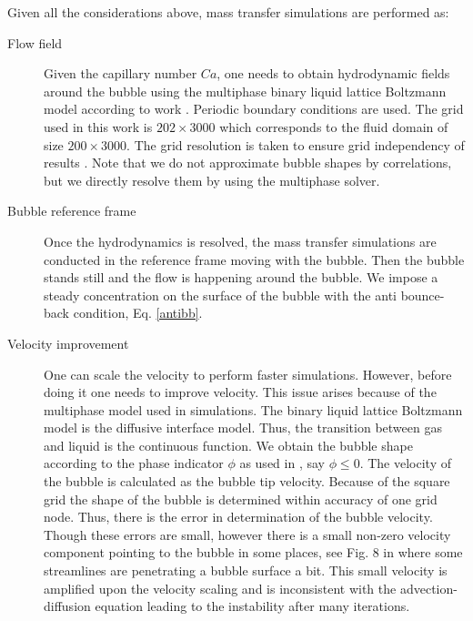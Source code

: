 \documentclass{article}
\begin{document}
Given all the considerations above, mass transfer simulations are performed as:
\begin{description}
 \item[Flow field] Given the capillary number $Ca$, one needs to obtain hydrodynamic fields around
the bubble using the multiphase binary liquid lattice Boltzmann model according to work
\cite{kuzmin-binary2d}. Periodic boundary conditions are used. The grid used in this work is
$202\times 3000$ which corresponds to the fluid domain  of size $200\times3000$. The grid resolution is
taken to ensure grid
independency of results \cite{kuzmin-binary2d}. Note that we do not approximate bubble shapes by correlations, but we directly resolve them by using the multiphase solver. 
 \item[Bubble reference frame] Once the hydrodynamics is resolved, the mass transfer simulations
are conducted in the reference frame moving with the bubble. Then the bubble stands still and the
flow is  happening around the
bubble. We impose a steady concentration on the surface
of the bubble with the anti bounce-back condition, Eq. \ref{antibb}.
 \item[Velocity improvement] One can scale the velocity to
perform faster simulations. However, before doing it one needs to improve velocity. This issue arises because of the
multiphase model used in simulations. The binary liquid lattice Boltzmann model is the diffusive
interface model. Thus, the
transition between gas and liquid is the continuous function. We obtain the bubble shape according
to the phase indicator $\phi$ as used in \cite{kuzmin-binary2d}, say $\phi\leq0$. The velocity of the
bubble is calculated as the bubble tip velocity. Because of the square grid the shape of the bubble is determined within accuracy of one grid node. Thus,
there is the error in determination of the bubble velocity. Though these errors are small, however
there is a small non-zero velocity component pointing to the bubble in some places, see Fig. 8 in
\cite{kuzmin-binary2d} where some streamlines are penetrating a bubble surface a bit.
This small velocity is amplified upon the velocity scaling and is inconsistent with the
advection-diffusion equation leading to the instability after many iterations.


\end{description}
\end{document}
